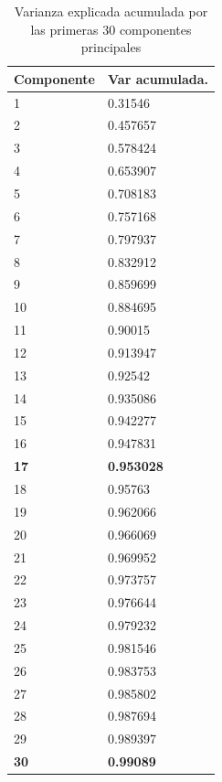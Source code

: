 \documentclass[journal]{IEEEtran}
\begin{document}
\begin{table}[ht!]
\label{table:pca_results}
\caption{Varianza explicada acumulada por las primeras 30 componentes principales}
\centering
\begin{tabular}{l | l }
Componente & Var acumulada.  \\
\hline
 1  &  0.31546  \\
 2  &  0.457657  \\
 3  &  0.578424  \\
 4  &  0.653907  \\
 5  &  0.708183  \\
 6  &  0.757168  \\
 7  &  0.797937  \\
 8  &  0.832912  \\
 9  &  0.859699  \\
10  &  0.884695  \\
11  &  0.90015  \\
12  &  0.913947  \\
13  &  0.92542  \\
14  &  0.935086  \\
15  &  0.942277  \\
16  &  0.947831  \\
\textbf{17}  &  \textbf{0.953028}  \\
18  &  0.95763  \\
19  &  0.962066  \\
20  &  0.966069  \\
21  &  0.969952  \\
22  &  0.973757  \\
23  &  0.976644  \\
24  &  0.979232  \\
25  &  0.981546  \\
26  &  0.983753  \\
27  &  0.985802  \\
28  &  0.987694  \\
29  &  0.989397  \\
\textbf{30}  &  \textbf{0.99089}  \\
\end{tabular}
\end{table}
\end{document}
